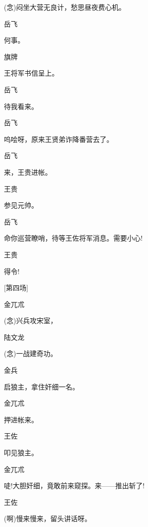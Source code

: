 {{{{({\akai 念})闷坐大营无良计，愁思昼夜费心机。}

{岳飞\hspace{30pt}~

何事。}

{旗牌\hspace{30pt}~

王将军书信呈上。}

{岳飞\hspace{30pt}~

待我看来。}

{岳飞\hspace{30pt}~

呜哙呀，原来王贤弟诈降番营去了。}

{岳飞\hspace{30pt}~

来，王贵进帐。}

{王贵\hspace{30pt}~

参见元帅。}

{岳飞\hspace{30pt}~

命你巡营瞭哨，待等王佐将军消息。需要小心!}

{王贵\hspace{30pt}~

得令!}

{[}第四场{]}

{金兀朮\hspace{20pt}~

({\akai 念})兴兵攻宋室，}

{陆文龙\hspace{20pt}~

({\akai 念})一战建奇功。}

{金兵\hspace{30pt}~

启狼主，拿住奸细一名。}

{金兀朮\hspace{20pt}~

押进帐来。}

{王佐\hspace{30pt}~

叩见狼主。}

{金兀朮\hspace{20pt}~

唗!大胆奸细，竟敢前来窥探。来------推出斩了!}

{王佐\hspace{30pt}~

(啊)慢来慢来，留头讲话呀。}

}}}
